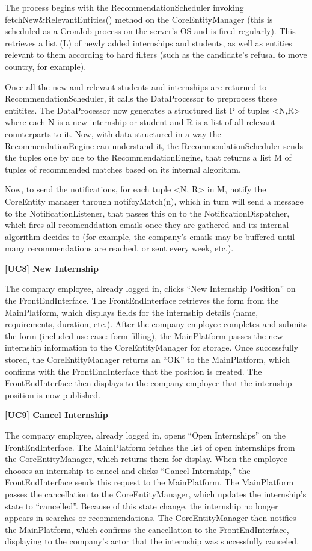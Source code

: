 The process begins with the RecommendationScheduler invoking fetchNew\&RelevantEntities() method on the CoreEntityManager (this is scheduled as a CronJob process on the server's OS and is fired regularly). This retrieves a list (L) of newly added internships and students, as well as entities relevant to them according to hard filters (such as the candidate's refusal to move country, for example). 

Once all the new and relevant students and internships are returned to RecommendationScheduler, it calls the DataProcessor to preprocess these entitites. The DataProcessor now generates a structured list P of tuples <N,R> where each N is a new internship or student and R is a list of all relevant counterparts to it. Now, with data structured in a way the RecommendationEngine can understand it, the RecommendationScheduler sends  the tuples one by one to the RecommendationEngine, that returns a list M of tuples of recommended matches based on its internal algorithm.

Now, to send the notifications, for each tuple <N, R> in M, notify the CoreEntity manager through notifcyMatch(n), which in turn will send a message to the NotificationListener, that passes this on to the NotificationDispatcher, which fires all recomenddation emails once they are gathered and its internal algorithm decides to (for example, the company's emails may be buffered until many recommendations are reached, or sent every week, etc.).


\textbf{[UC8] New Internship}

The company employee, already logged in, clicks ``New Internship Position'' on the FrontEndInterface. The FrontEndInterface retrieves the form from the MainPlatform, which displays fields for the internship details (name, requirements, duration, etc.). After the company employee completes and submits the form (included use case: form filling), the MainPlatform passes the new internship information to the CoreEntityManager for storage. Once successfully stored, the CoreEntityManager returns an ``OK'' to the MainPlatform, which confirms with the FrontEndInterface that the position is created. The FrontEndInterface then displays to the company employee that the internship position is now published.

\textbf{[UC9] Cancel Internship}

The company employee, already logged in, opens ``Open Internships'' on the FrontEndInterface. The MainPlatform fetches the list of open internships from the CoreEntityManager, which returns them for display. When the employee chooses an internship to cancel and clicks ``Cancel Internship,'' the FrontEndInterface sends this request to the MainPlatform. The MainPlatform passes the cancellation to the CoreEntityManager, which updates the internship’s state to ``cancelled''. Because of this state change, the internship no longer appears in searches or recommendations. The CoreEntityManager then notifies the MainPlatform, which confirms the cancellation to the FrontEndInterface, displaying to the company's actor that the internship was successfully canceled.

